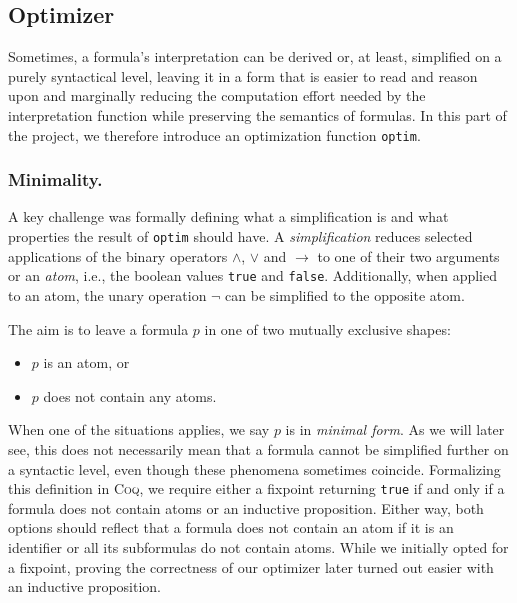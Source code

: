 \subsection{Optimizer}

Sometimes, a formula's interpretation can be derived or, at least, simplified on a purely syntactical level, leaving it in a form that is easier to read and reason upon and marginally reducing the computation effort needed by the interpretation function while preserving the semantics of formulas.
In this part of the project, we therefore introduce an optimization function \texttt{optim}.

\subsubsection{Minimality.}

A key challenge was formally defining what a simplification is and what properties the result of \texttt{optim} should have.
A \emph{simplification} reduces selected applications of the binary operators $\land$, $\lor$ and $\rightarrow$ to one of their two arguments or an \emph{atom}, i.e., the boolean values \texttt{true} and \texttt{false}. 
Additionally, when applied to an atom, the unary operation $\neg$ can be simplified to the opposite atom.

The aim is to leave a formula $p$ in one of two mutually exclusive shapes:
\begin{itemize}
    \item $p$ is an atom, or
    \item $p$ does not contain any atoms.
\end{itemize}
When one of the situations applies, we say $p$ is in \emph{minimal form}. 
As we will later see, this does not necessarily mean that a formula cannot be simplified further on a syntactic level, even though these phenomena sometimes coincide.
Formalizing this definition in \textsc{Coq}, we require either a fixpoint returning \texttt{true} if and only if a formula does not contain atoms or an inductive proposition.
Either way, both options should reflect that a formula does not contain an atom if it is an identifier or all its subformulas do not contain atoms. 
While we initially opted for a fixpoint, proving the correctness of our optimizer later turned out easier with an inductive proposition.


